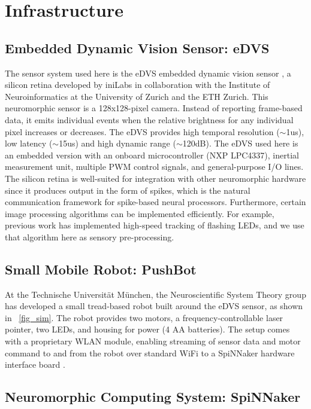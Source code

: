 \documentclass{frontiersSCNS}
\begin{document}
\section{Infrastructure}
\label{infrastructure}

\subsection{Embedded Dynamic Vision Sensor: eDVS}
The sensor system used here is the eDVS embedded dynamic vision 
sensor \citep{conradt2009embedded}, a silicon retina developed by iniLabs in 
collaboration with the Institute of Neuroinformatics at the University of 
Zurich and the ETH Zurich. This neuromorphic sensor is a 128x128-pixel camera. 
Instead of reporting frame-based data, it emits individual events when the 
relative brightness for any individual pixel increases or decreases. The eDVS 
provides high temporal resolution ($\sim$1us), low latency ($\sim$15us) and high dynamic 
range ($\sim$120dB). The eDVS used here is an embedded version with an onboard 
microcontroller (NXP LPC4337), inertial measurement unit, multiple PWM control 
signals, and general-purpose I/O lines. The silicon retina is well-suited for 
integration with other neuromorphic hardware since it produces output in the 
form of spikes, which is the natural communication framework for spike-based 
neural processors. Furthermore, certain image processing algorithms can be 
implemented efficiently. For example, previous work \citep{muller2011miniature} 
has implemented high-speed tracking of flashing LEDs, and we use that algorithm 
here as sensory pre-processing.


\subsection{Small Mobile Robot: PushBot}
At the Technische Universit{\"a}t M{\"u}nchen, the Neuroscientific
System Theory group has developed a small tread-based robot built around the 
eDVS sensor, as shown in \figurename~\ref{fig_sim}. The robot provides two motors, a frequency-controllable laser pointer, two LEDs, and housing for power (4 AA batteries). The setup comes with a proprietary WLAN module, enabling streaming of sensor data and motor command to and from the robot over standard WiFi to a SpiNNaker hardware interface board \citep{denk2013}.


\subsection{Neuromorphic Computing System: SpiNNaker}
\end{document}
